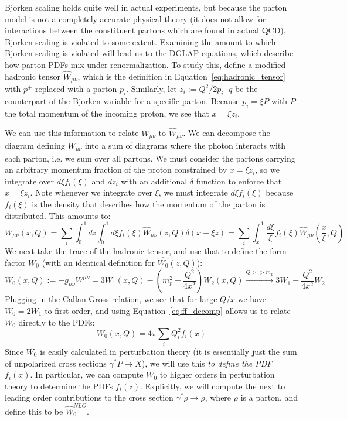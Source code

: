\documentclass[11pt, oneside]{article}   	%
\theoremstyle{definition}
\begin{document}
Bjorken scaling holds quite well in actual experiments, but because the parton model is not a completely accurate physical theory (it does not 
allow for interactions between the constituent partons which are found in actual QCD), Bjorken scaling is violated to some extent. Examining the 
amount to which Bjorken scaling is violated will lead us to the DGLAP equations, which describe how parton PDFs mix under renormalization. 
To study this, define a modified hadronic tensor $\hat{W}_{\mu\nu}$, which is the definition in Equation~\ref{eq:hadronic_tensor} with $p^+$ 
replaced with a parton $p_i$. Similarly, let $z_i := Q^2 / 2p_i\cdot q$ be the counterpart of the Bjorken variable for a specific parton. Because 
$p_i = \xi P$ with $P$ the total momentum of the incoming proton, we see that $x = \xi z_i$. 

We can use this information to relate $W_{\mu\nu}$ to $\hat W_{\mu\nu}$. We can decompose the diagram defining $W_{\mu\nu}$ into 
a sum of diagrams where the photon interacts with each parton, i.e. we sum over all partons. We must consider the partons carrying an 
arbitrary momentum fraction of the proton constrained by $x = \xi z_i$, so we integrate over $d\xi f_i(\xi)$ and $dz_i$ with an additional 
$\delta$ function to enforce that $x = \xi z_i$. Note whenever we integrate over $\xi$, we must integrate $d\xi f_i(\xi)$ because $f_i(\xi)$ 
is the density that describes how the momentum of the parton is distributed. This amounts to:
\begin{equation}
	W_{\mu\nu}(x, Q) = \sum_i\int_0^1 dz\int_0^1 d\xi f_i(\xi) \hat{W}_{\mu\nu}(z, Q)\delta(x - \xi z) = \sum_i\int_x^1 \frac{d\xi}{\xi} f_i(\xi)
	\hat{W}_{\mu\nu}\left(\frac{x}{\xi}, Q\right)~
	\label{eq:parton_tensor}
\end{equation}
We next take the trace of the hadronic tensor, and use that to define the form factor $W_0$ (with an identical definition for $\hat{W_0}(z, Q)$):
\begin{equation}
	W_0(x, Q) := -g_{\mu\nu}W^{\mu\nu} = 3W_1(x, Q) - \left(m_p^2 + \frac{Q^2}{4x^2}\right)W_2(x, Q)\xrightarrow{Q >> m_p} 3W_1 
	- \frac{Q^2}{4x^2}W_2
\end{equation}
Plugging in the Callan-Gross relation, we see that for large $Q / x$ we have $W_0 = 2W_1$ to first order, and using Equation~\ref{eq:ff_decomp} 
allows us to relate $W_0$ directly to the PDFs:
\begin{equation}
	W_0(x, Q) = 4\pi\sum_i Q_i^2 f_i(x)~
	\label{eq:ff_to_pdf}
\end{equation}
Since $W_0$ is easily calculated in perturbation theory (it is essentially just the sum of unpolarized cross sections $\gamma^* P\rightarrow X$), we 
will use this \textit{to define the PDF $f_i(x)$}. In particular, we can compute $W_0$ to higher orders in perturbation theory to determine 
the PDFs $f_i(z)$. Explicitly, we will compute the next to leading order contributions to the cross section $\gamma^* \rho\rightarrow \rho$, where 
$\rho$ is a parton, and define this to be $\hat W_0^{NLO}$. 
\end{document}
